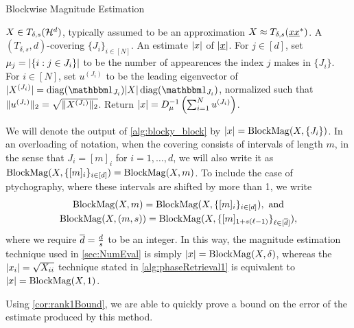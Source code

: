 \begin{algorithm}[htbp]
\renewcommand{\algorithmicrequire}{\textbf{Input:}}
\renewcommand{\algorithmicensure}{\textbf{Output:}}
\caption{Blockwise Magnitude Estimation}
\label{alg:blocky_block}
\begin{algorithmic}[1]
    \REQUIRE $X \in T_{\delta, s}(\mathcal{H}^d)$, typically assumed to be an approximation $X \approx T_{\delta, s}(\underline{x} \underline{x}^*)$.  A $(T_{\delta, s}, d)$-covering $\{J_i\}_{i \in [N]}$.
    \ENSURE An estimate $\lvert x\rvert$ of $\lvert\underline{x}\rvert$.
    \STATE For $j \in [d]$, set $\mu_j = \lvert\{i : j \in J_i\}\rvert$ to be the number of appearences the index $j$ makes in $\{J_i\}$.
    \STATE For $i \in [N]$, set $u^{(J_i)}$ to be the leading eigenvector of $\abs{X^{(J_i)}} = \diag(\one_{J_i}) \abs{X} \diag(\one_{J_i})$, normalized such that $\lVert u^{(J_i)}\rVert_2 = \sqrt{\lVert X^{(J_i)}\rVert_2}$.
    \STATE Return $\lvert x\rvert = D_\mu^{-1}\left(\sum_{i = 1}^N u^{(J_i)}\right)$.
    \end{algorithmic}
\end{algorithm}

We will denote the output of \cref{alg:blocky_block} by $\lvert x\rvert = \operatorname{BlockMag}(X, \{J_i\})$.  In an overloading of notation, when the covering consists of intervals of length $m$, in the sense that $J_i = [m]_i$ for $i = 1, \ldots, d$, we will also write it as $\operatorname{BlockMag}(X, \{[m]_i\}_{i \in [d]}) = \operatorname{BlockMag}(X, m)$.  To include the case of ptychography, where these intervals are shifted by more than 1, we write \begin{equation}\begin{gathered} \operatorname{BlockMag}(X, m) = \operatorname{BlockMag}(X, \{[m]_i\}_{i \in [d]}), \ \text{and} \\ \operatorname{BlockMag}(X, (m, s)) = \operatorname{BlockMag}(X, \{[m]_{1 + s (\ell-1)}\}_{\ell \in [\overline{d}]}), \end{gathered}\label{eq:bm_overload} \end{equation} where we require $\overline{d} = \frac{d}{s}$ to be an integer.  In this way, the magnitude estimation technique used in \cref{sec:NumEval} is simply $\lvert x\rvert = \operatorname{BlockMag}(X, \delta)$, whereas the $\lvert x_i\rvert = \sqrt{X_{ii}}$ technique stated in \cref{alg:phaseRetrieval1} is equivalent to $\lvert x\rvert = \operatorname{BlockMag}(X, 1)$.

Using \cref{cor:rank1Bound}, we are able to quickly prove a bound on the error of the estimate produced by this method.

